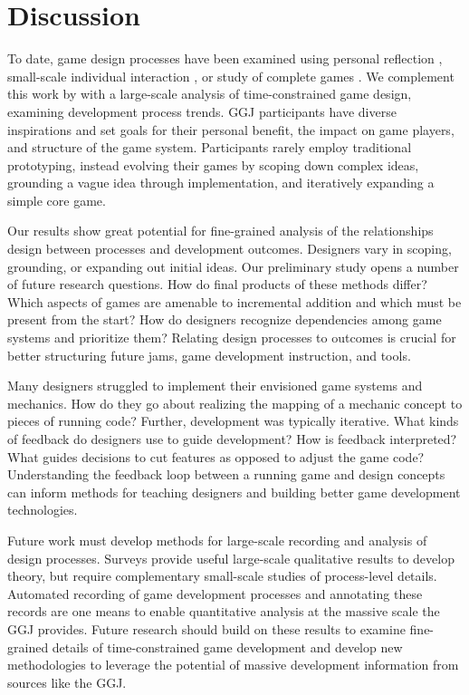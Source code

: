 \documentclass{sig-alternate}
\begin{document}
\section{Discussion}
To date, game design processes have been examined using personal reflection \cite{anthropy2012:zinesters,hunicke2004:mda}, small-scale individual interaction \cite{nelson2009:reqanal}, or study of complete games \cite{bogost2011:howto}. We complement this work by with a large-scale analysis of time-constrained game design, examining development process trends.
GGJ participants have diverse inspirations and set goals for their personal benefit, the impact on game players, and structure of the game system.
Participants rarely employ traditional prototyping, instead evolving their games by scoping down complex ideas, grounding a vague idea through implementation, and iteratively expanding a simple core game.

Our results show great potential for fine-grained analysis of the relationships design between processes and development outcomes. Designers vary in scoping, grounding, or expanding out initial ideas. Our preliminary study opens a number of future research questions. How do final products of these methods differ? Which aspects of games are amenable to incremental addition and which must be present from the start? How do designers recognize dependencies among game systems and prioritize them? Relating design processes to outcomes is crucial for better structuring future jams, game development instruction, and tools.

Many designers struggled to implement their envisioned game systems and mechanics. How do they go about realizing the mapping of a mechanic concept to pieces of running code? Further, development was typically iterative. What kinds of feedback do designers use to guide development? How is feedback interpreted? What guides decisions to cut features as opposed to adjust the game code? Understanding the feedback loop between a running game and design concepts can inform methods for teaching designers and building better game development technologies.

Future work must develop methods for large-scale recording and analysis of design processes. Surveys provide useful large-scale qualitative results to develop theory, but require complementary small-scale studies of process-level details. Automated recording of game development processes and annotating these records are one means to enable quantitative analysis at the massive scale the GGJ provides. 
Future research should build on these results to examine fine-grained details of time-constrained game development and develop new methodologies to leverage the potential of massive development information from sources like the GGJ.
\end{document}
